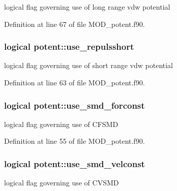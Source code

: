 logical flag governing use of long range vdw potential 



Definition at line 67 of file M\-O\-D\-\_\-potent.\-f90.

\hypertarget{classpotent_aa509648794c36f8ebfd31d28635f55b4}{
\subsubsection[{use\-\_\-repulsshort}]{\setlength{\rightskip}{0pt plus 5cm}logical potent\-::use\-\_\-repulsshort}}\label{classpotent_aa509648794c36f8ebfd31d28635f55b4}


logical flag governing use of short range vdw potential 



Definition at line 63 of file M\-O\-D\-\_\-potent.\-f90.

\hypertarget{classpotent_a5ef3f724b2f1d64056187c24b7e9b223}{
\subsubsection[{use\-\_\-smd\-\_\-forconst}]{\setlength{\rightskip}{0pt plus 5cm}logical potent\-::use\-\_\-smd\-\_\-forconst}}\label{classpotent_a5ef3f724b2f1d64056187c24b7e9b223}


logical flag governing use of C\-F\-S\-M\-D 



Definition at line 55 of file M\-O\-D\-\_\-potent.\-f90.

\hypertarget{classpotent_a82a41d34836bbf30d7e5f88ee70101b1}{
\subsubsection[{use\-\_\-smd\-\_\-velconst}]{\setlength{\rightskip}{0pt plus 5cm}logical potent\-::use\-\_\-smd\-\_\-velconst}}\label{classpotent_a82a41d34836bbf30d7e5f88ee70101b1}


logical flag governing use of C\-V\-S\-M\-D 



